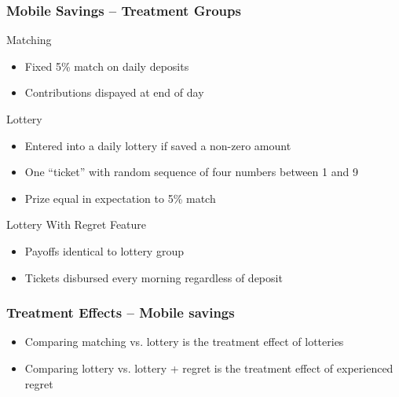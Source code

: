 \documentclass{beamer}
\begin{document}
\begin{frame} \frametitle{Mobile Savings -- Treatment Groups} \pause
	
	\begin{block}{Matching}
		\begin{itemize}
		\item Fixed 5\% match on daily deposits \pause
		\item Contributions dispayed at end of day \pause
		\end{itemize}
	\end{block}

	\begin{block}{Lottery}
		\begin{itemize}
		\item Entered into a daily lottery if saved a non-zero amount \pause
		\item One ``ticket'' with random sequence of four numbers between 1 and 9 \pause
		\item Prize equal in expectation to 5\% match \pause
		\end{itemize}
	\end{block}

	\begin{block}{Lottery With Regret Feature}
		\begin{itemize}
		\item Payoffs identical to lottery group \pause
		\item Tickets disbursed every morning regardless of deposit \pause
		\end{itemize}
	\end{block}

\end{frame}

\begin{frame} \frametitle{Treatment Effects -- Mobile savings} \pause
	
	\begin{itemize}
	\item Comparing matching vs. lottery is the treatment effect of lotteries \pause
	\item Comparing lottery vs. lottery + regret is the treatment effect of experienced regret \pause
	\end{itemize}

\end{frame}
\end{document}
